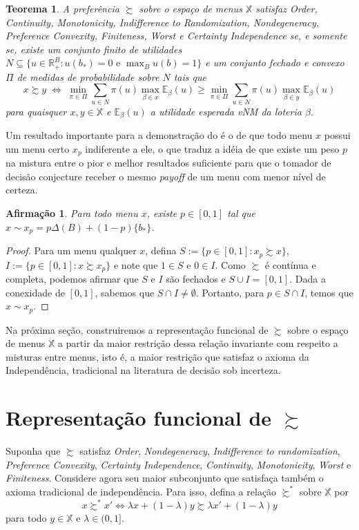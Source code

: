 \documentclass[12pt, a4paper]{article}
\theoremstyle{nonumberplain}
\newtheorem{proof}{Dem.}
\theoremstyle{plain}
\newtheorem{theorem}{Teorema}
\theoremstyle{plain}
\newtheorem{claim}{Afirmação}
\theoremstyle{plain}
\theoremstyle{nonumberplain}
\begin{document}
\begin{theorem} \label{nossoteorema} A preferência $\succsim$ sobre o espaço de menus $\mathbb{X}$ satisfaz \emph{Order}, \emph{Continuity}, \emph{Monotonicity}, \emph{Indifference to Randomization}, \emph{Nondegeneracy}, \emph{Preference Convexity}, \emph{Finiteness}, \emph{Worst} e \emph{Certainty Independence} se, e somente se, existe um conjunto finito de utilidades $N\subseteq \{u \in \mathbb{R}^B_+:u(b_*)=0\text { e }\max_{B}u(b)=1\}$ e um conjunto fechado e convexo $\Pi$ de medidas de probabilidade sobre $N$ tais que
\[x \succsim y \;\Leftrightarrow\; \min_{\pi\in\Pi}\sum_{u\in N} \pi(u)\max_{\beta\in x}\mathbb{E}_\beta(u)\geq \min_{\pi\in\Pi}\sum_{u\in N} \pi(u)\max_{\beta\in y}\mathbb{E}_\beta(u)\]
para quaisquer $x,y\in\mathbb{X}$ e $\mathbb{E}_\beta(u)$ a utilidade esperada vNM
da loteria $\beta$. \end{theorem}
Um resultado importante para a demonstração do  é o de que todo menu $x$ possui um menu certo $x_p$ indiferente a ele, o que traduz a idéia de que existe um peso $p$ na mistura entre o pior e melhor resultados suficiente para que o tomador de decisão conjecture receber o mesmo \emph{payoff} de um menu com menor nível de certeza.
\begin{claim}Para todo menu $x$, existe $p\in[0,1]$ tal que $x\sim x_p=p\Delta(B)+(1-p)\{b_*\}$. \end{claim}
\begin{proof}
Para um menu qualquer $x$, defina $S:=\{p\in[0,1] : x_p\succsim x\}$, $I:=\{p\in[0,1] : x\succsim x_p\}$ e note que $1\in S$ e $0\in I$. Como $\succsim$ é contínua e completa, podemos afirmar que $S$ e $I$ são fechados e $S\cup I=[0,1]$. Dada a conexidade de $[0,1]$, sabemos que $S\cap I\neq \emptyset$. Portanto, para $p\in S\cap I$, temos que $x\sim x_p$.
\end{proof}

Na próxima seção, construiremos a representação funcional de $\succsim$ sobre o espaço de menus $\mathbb{X}$ a partir da maior restrição dessa relação invariante com respeito a misturas entre menus, isto é, a maior restrição que satisfaz o axioma da Independência, tradicional na literatura de decisão sob incerteza.

\section{Representação funcional de $\succsim$}
Suponha que $\succsim$ satisfaz \textit{Order}, \textit{Nondegeneracy}, \textit{Indifference to randomization}, \textit{Preference Convexity}, \textit{Certainty Independence}, \textit{Continuity}, \textit{Monotonicity}, \textit{Worst} e \textit{Finiteness}. Considere agora seu maior subconjunto que satisfaça também o axioma tradicional de independência. Para isso, defina a relação $\succsim^*$ sobre $\mathbb{X}$ por $$x\succsim^* x' \Leftrightarrow \lambda x + (1-\lambda)y \succsim \lambda x' + (1-\lambda)y$$ para todo $y\in \mathbb{X}$ e $\lambda\in(0,1]$.
\end{document}
